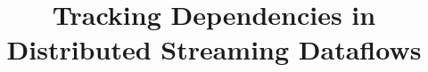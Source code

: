 \documentclass[sigconf]{acmart}
\theoremstyle{remark}
\begin{document}

\title {Tracking Dependencies in Distributed Streaming Dataflows}





\end{document}
